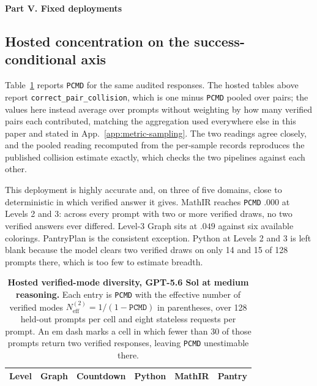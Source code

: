 \documentclass{article}
\newcommand{\1}{\mathbf 1}
\newcommand{\pmd}{\texttt{PCMD}}
\newcommand{\neff}{\ensuremath{N^{(2)}_{\mathrm{eff}}}}
\theoremstyle{remark}
\theoremstyle{definition}
\theoremstyle{plain}
\begin{document}




\clearpage

\clearpage
{}
\begin{center}\large\textbf{Part V. Fixed deployments}\end{center}



\subsection{Hosted concentration on the success-conditional axis}
\label{app:hosted-mode-diversity}

Table~\ref{tab:hosted-mode-diversity} reports \pmd{} for the same audited
responses. The hosted tables above report \texttt{correct\_pair\_collision},
which is one minus \pmd{} pooled over pairs; the values here instead average
over prompts without weighting by how many verified pairs each contributed,
matching the aggregation used everywhere else in this paper and stated in
App.~\ref{app:metric-sampling}. The two readings agree closely,
and the pooled reading recomputed from the per-sample records reproduces the
published collision estimate exactly, which checks the two pipelines against
each other.

This deployment is highly accurate and, on three of five domains, close to
deterministic in which verified answer it gives. MathIR reaches \pmd{} $.000$
at Levels 2 and 3: across every prompt with two or more verified draws, no two
verified answers ever differed. Level-3 Graph sits at $.049$ against six
available colorings. PantryPlan is the consistent exception. Python at Levels 2
and 3 is left blank because the model clears two verified draws on only 14 and
15 of 128 prompts there, which is too few to estimate breadth.

\begin{table}[!htbp]
  \centering
  \caption{\textbf{Hosted verified-mode diversity, GPT-5.6 Sol at medium
  reasoning.} Each entry is \pmd{} with the effective number of verified modes
  $\neff=1/(1-\pmd{})$ in parentheses, over 128 held-out prompts per cell and
  eight stateless requests per prompt. An em dash marks a cell in which fewer
  than 30 of those prompts return two verified responses, leaving \pmd{}
  unestimable there.}
  \label{tab:hosted-mode-diversity}
  \small
  \begin{tabular}{lccccc}
    \toprule
    Level & Graph & Countdown & Python & MathIR & Pantry \\
    \midrule
    
  \end{tabular}
\end{table}
\end{document}
